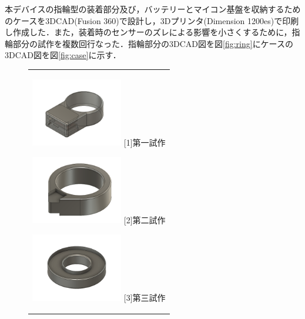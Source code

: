 \documentclass[11pt,a4paper]{jarticle}
\begin{document}
本デバイスの指輪型の装着部分及び，バッテリーとマイコン基盤を収納するためのケースを3DCAD(Fusion 360)で設計し，3Dプリンタ(Dimension 1200es)で印刷し作成した．また，装着時のセンサーのズレによる影響を小さくするために，指輪部分の試作を複数回行なった．指輪部分の3DCAD図を図\ref{fig:ring}にケースの3DCAD図を図\ref{fig:case}に示す．

\begin{figure}[H]
  \begin{center}
    \begin{tabular}{c}

      \begin{minipage}{0.25\hsize}
        \begin{center}
          \includegraphics[clip, width=4cm]{fig/ring1.png}
          \hspace{3.2cm} [1]第一試作
        \end{center}
      \end{minipage}

      \begin{minipage}{0.25\hsize}
        \begin{center}
          \includegraphics[clip, width=4cm]{fig/ring2.png}
          \hspace{3.2cm} [2]第二試作
        \end{center}
      \end{minipage}

            \begin{minipage}{0.25\hsize}
        \begin{center}
          \includegraphics[clip, width=4cm]{fig/ring3.png}
          \hspace{3.2cm} [3]第三試作
        \end{center}
      \end{minipage}


\end{tabular}
\end{center}
\end{figure}
\end{document}

